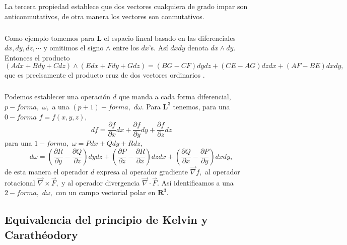 \documentclass{article}
\theoremstyle{definition} \newtheorem{defi}{Definici\'on}
\theoremstyle{definition} \newtheorem{teo}{Teorema}
\theoremstyle{definition} \newtheorem{cor}{Corolario}
\begin{document}
La tercera propiedad establece que dos vectores cualquiera de grado impar son anticonmutativos, de otra manera los vectores son conmutativos.
\subparagraph{}
Como ejemplo tomemos para $\mathbf{L}$ el espacio lineal basado en las diferenciales $dx,dy,dz,\cdots$ y omitimos el signo $\wedge$ entre los $dx$'s. As\'i $dxdy$ denota $dx\wedge dy.$ Entonces el producto
$$(Adx+Bdy+Cdz)\wedge(Edx+Fdy+Gdz)=(BG-CF)dydz+(CE-AG)dzdx+(AF-BE)dxdy,$$
que es precisamente el producto cruz de dos vectores ordinarios \cite{HF}.
\subparagraph{}
Podemos establecer una operaci\'on $d$ que manda a cada forma diferencial, $p-forma,$ $\omega,$ a una $\left(p+1\right)-forma,$ $d\omega.$ Para $\mathbf{L}^3$ tenemos, para una $0-forma$ $f=f(x,y,z),$ 
\begin{equation}
df = \frac{\partial{f}}{\partial{x}}dx + \frac{\partial{f}}{\partial{y}}dy + \frac{\partial{f}}{\partial{z}}dz
\end{equation}
para una $1-forma,$ $\omega = Pdx+Qdy+Rdz,$
\begin{equation}
d\omega = \left(\frac{\partial R}{\partial y}-\frac{\partial Q}{\partial z}\right)dydz+\left(\frac{\partial P}{\partial z}-\frac{\partial R}{\partial x}\right)dzdx+\left(\frac{\partial Q}{\partial x}-\frac{\partial P}{\partial y}\right)dxdy,
\end{equation}
de esta manera el operador $d$ expresa al operador gradiente $\vec \nabla f,$ al operador rotacional $\vec \nabla \times \vec F,$ y al operador divergencia $\vec \nabla \cdot \vec F.$ As\'i identificamos a una $2-forma,$ $d\omega,$ con un campo vectorial polar en $\mathbf{R}^3.$
\subsection{Equivalencia del principio de Kelvin y Carath\'eodory}
\end{document}
